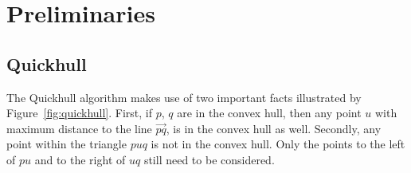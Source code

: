 \section{Preliminaries}

\subsection{Quickhull}

The Quickhull algorithm makes use of two important facts 
illustrated by Figure~\ref{fig:quickhull}. First, if $p$, $q$ are in the 
convex hull, then any point $u$ with maximum distance to the line $\vec{pq}$, 
is in the convex hull as well. Secondly, any point within the triangle 
$puq$ is not in the convex hull. Only the points to the left of $pu$ and 
to the right of $uq$ still need to be considered.

